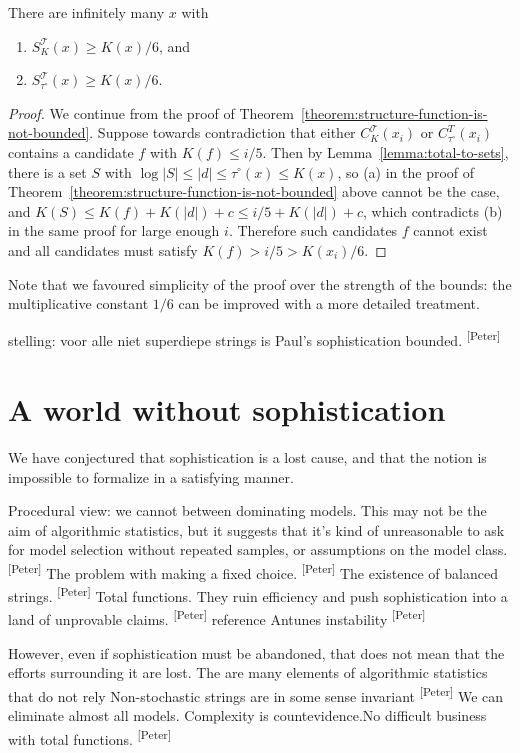 \documentclass{style/llncs}
\newcommand{\T}{\mathscr T}
\newcommand{\pb}[1]{\textcolor{OliveGreen}{\small #1 \textsuperscript{[Peter]} }}
\begin{document}
\begin{theorem}
There are infinitely many $x$ with 
\begin{enumerate}
  \item $S^\T_K(x) \geq K(x)/6$, {and}\label{eq:poezenvoer}
  \item $S^\T_{\tau^\circ}(x) \geq K(x)/6$. \label{eq:hondevoer}
\end{enumerate}
\end{theorem}
\begin{proof}
We continue from the proof of Theorem~\ref{theorem:structure-function-is-not-bounded}. Suppose towards contradiction that either $C^\T_K(x_i)$ or $C^T_{\tau^\circ}(x_i)$ contains a candidate $f$ with $K(f)\le i/5$. Then by Lemma~\ref{lemma:total-to-sets}, there is a set $S$ with $\log|S|\le|d|\le\tau^\circ(x)\le K(x)$, so (a) in the proof of Theorem~\ref{theorem:structure-function-is-not-bounded} above cannot be the case, and $K(S)\le K(f)+K(|d|)+c\le i/5+K(|d|)+c$, which contradicts (b) in the same proof for large enough $i$. Therefore such candidates $f$ cannot exist and all candidates must satisfy $K(f)>i/5>K(x_i)/6$.
\end{proof}
Note that we favoured simplicity of the proof over the strength of the bounds: the multiplicative constant $1/6$ can be improved with a more detailed treatment.

\pb{
stelling: voor alle niet superdiepe strings is Paul's sophistication bounded.
}

\section{A world without sophistication}

We have conjectured that sophistication is a lost cause, and that the notion is impossible to formalize in a satisfying manner. 

\pb{Procedural view: we cannot between dominating models. This may not be the aim of algorithmic statistics, but it suggests that it's kind of unreasonable to ask for model selection without repeated samples, or assumptions on the model class.} 
\pb{The problem with making a fixed choice.}
\pb{The existence of balanced strings.}
\pb{Total functions. They ruin efficiency and push sophistication into a land of unprovable claims.}
\pb{reference Antunes instability}

However, even if sophistication must be abandoned, that does not mean that the efforts surrounding it are lost. The are many elements of algorithmic statistics that do not rely 
\pb{Non-stochastic strings are in some sense invariant}
\pb{We can eliminate almost all models. Complexity is countevidence.No difficult business with total functions.}
\end{document}

